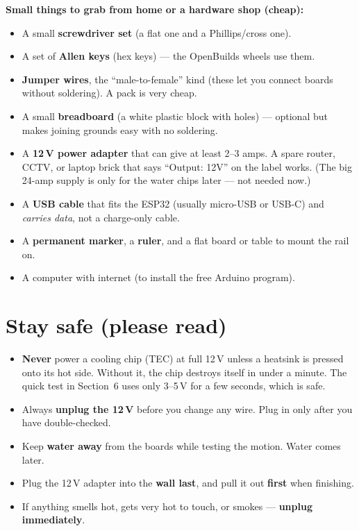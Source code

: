 \documentclass[11pt,a4paper]{article}
\begin{document}
\textbf{Small things to grab from home or a hardware shop (cheap):}
\begin{itemize}[leftmargin=*,itemsep=1pt]
  \item A small \textbf{screwdriver set} (a flat one and a Phillips/cross one).
  \item A set of \textbf{Allen keys} (hex keys) --- the OpenBuilds wheels use them.
  \item \textbf{Jumper wires}, the ``male-to-female'' kind (these let you connect boards without
  soldering). A pack is very cheap.
  \item A small \textbf{breadboard} (a white plastic block with holes) --- optional but makes joining
  grounds easy with no soldering.
  \item A \textbf{12\,V power adapter} that can give at least 2--3 amps. A spare router, CCTV, or laptop
  brick that says ``Output: 12V'' on the label works. (The big 24-amp supply is only for the water chips
  later --- not needed now.)
  \item A \textbf{USB cable} that fits the ESP32 (usually micro-USB or USB-C) and \emph{carries data}, not
  a charge-only cable.
  \item A \textbf{permanent marker}, a \textbf{ruler}, and a flat board or table to mount the rail on.
  \item A computer with internet (to install the free Arduino program).
\end{itemize}

\section{Stay safe (please read)}

\begin{itemize}[leftmargin=*,itemsep=2pt]
  \item \textbf{Never} power a cooling chip (TEC) at full 12\,V unless a heatsink is pressed onto its hot
  side. Without it, the chip destroys itself in under a minute. The quick test in Section~6 uses only
  3--5\,V for a few seconds, which is safe.
  \item Always \textbf{unplug the 12\,V} before you change any wire. Plug in only after you have
  double-checked.
  \item Keep \textbf{water away} from the boards while testing the motion. Water comes later.
  \item Plug the 12\,V adapter into the \textbf{wall last}, and pull it out \textbf{first} when finishing.
  \item If anything smells hot, gets very hot to touch, or smokes --- \textbf{unplug immediately}.
\end{itemize}
\end{document}
